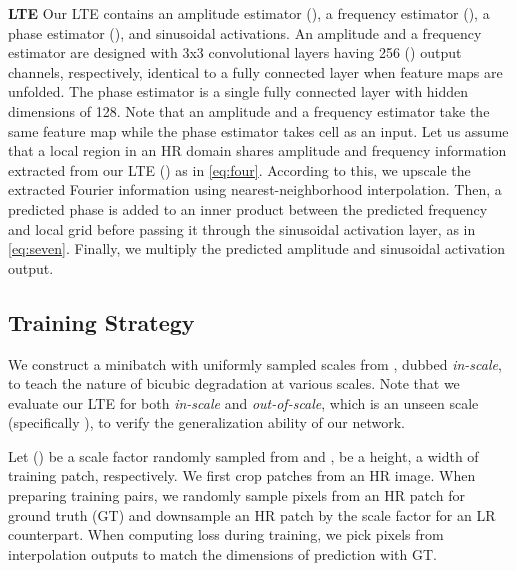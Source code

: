 \documentclass[10pt,twocolumn,letterpaper]{article}
\begin{document}
\textbf{LTE} Our LTE contains an amplitude estimator (), a frequency estimator (), a phase estimator (), and sinusoidal activations. An amplitude and a frequency estimator are designed with 3x3 convolutional layers having 256 () output channels, respectively, identical to a fully connected layer when feature maps are unfolded. The phase estimator is a single fully connected layer with hidden dimensions of 128. Note that an amplitude and a frequency estimator take the same feature map while the phase estimator takes cell as an input. Let us assume that a  local region in an HR domain shares amplitude and frequency information extracted from our LTE () as in \cref{eq:four}. According to this, we upscale the extracted Fourier information using nearest-neighborhood interpolation. Then, a predicted phase is added to an inner product between the predicted frequency and local grid before passing it through the sinusoidal activation layer, as in \cref{eq:seven}. Finally, we multiply the predicted amplitude and sinusoidal activation output.



\subsection{Training Strategy}
We construct a minibatch with uniformly sampled scales from , dubbed \textit{in-scale}, to teach the nature of bicubic degradation at various scales. Note that we evaluate our LTE for both \textit{in-scale} and \textit{out-of-scale}, which is an unseen scale (specifically ), to verify the generalization ability of our network.

Let  () be a scale factor randomly sampled from  and ,  be a height, a width of training patch, respectively. We first crop  patches from an HR image. When preparing training pairs, we randomly sample  pixels from an HR patch for ground truth (GT) and downsample an HR patch by the scale factor  for an LR counterpart. When computing loss during training, we pick  pixels from interpolation outputs to match the dimensions of prediction with GT.
\end{document}
